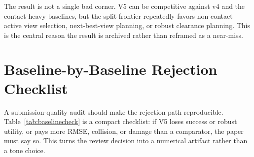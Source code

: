 \documentclass{article}
\begin{document}
\begin{table}[t]
\centering
\scriptsize
{}
\caption{Split-level non-oracle frontier. Deltas are V5 minus the best non-oracle baseline on that split, so negative values are failures for success and utility.}
\label{tab:splitfrontier}
\end{table}


The result is not a single bad corner. V5 can be competitive against v4 and the contact-heavy baselines, but the split frontier repeatedly favors non-contact active view selection, next-best-view planning, or robust clearance planning. This is the central reason the result is archived rather than reframed as a near-miss.

\section{Baseline-by-Baseline Rejection Checklist}
A submission-quality audit should make the rejection path reproducible. Table~\ref{tab:baselinecheck} is a compact checklist: if V5 loses success or robust utility, or pays more RMSE, collision, or damage than a comparator, the paper must say so. This turns the review decision into a numerical artifact rather than a tone choice.
\end{document}
